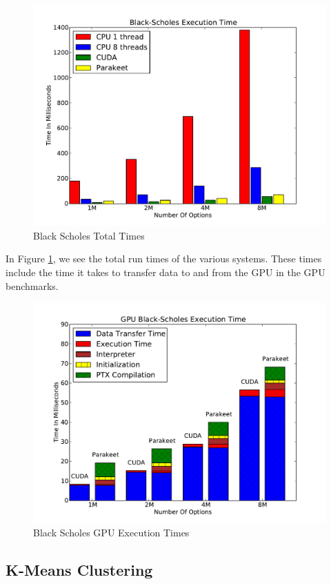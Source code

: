 \documentclass[preprint]{sigplanconf}
\begin{document}
\begin{figure}
\includegraphics[scale=0.45]{BSWCPU.pdf}
\caption{Black Scholes Total Times}
\label{BSCPU}
\end{figure}

In Figure \ref{BSCPU}, we see the total run times of the various systems. These times include the time it takes to transfer data to and from the GPU in the GPU benchmarks.

\begin{figure}
\includegraphics[scale=0.45]{BSNOCPU.pdf}
\caption{Black Scholes GPU Execution Times}
\label{BSGPU}
\end{figure}

\subsection{K-Means Clustering}
\label{results-k-means}
\end{document}
